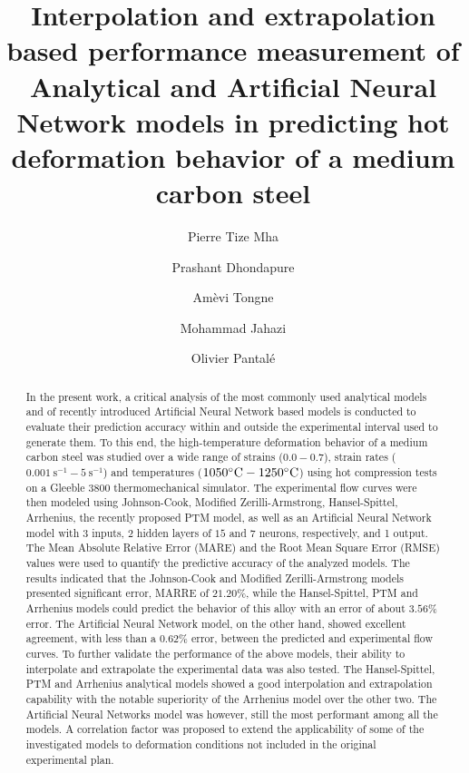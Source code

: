 \documentclass[twoside,english,1p,final,sort&compress]{elsarticle}
\theoremstyle{plain}
\DeclareRobustCommand{\ps}{\text{s}^{-1}}
\begin{document}
\begin{frontmatter}

\title{Interpolation and extrapolation based performance measurement of Analytical and Artificial Neural Network models in predicting hot deformation behavior of a medium carbon steel}

\author[LGP]{Pierre Tize Mha}
\author[ETS]{Prashant Dhondapure}
\author[LGP]{Amèvi Tongne}
\author[ETS]{Mohammad Jahazi}
\author[LGP]{Olivier Pantalé}


\address[LGP]{Laboratoire Génie de Production, INP/ENIT, Université de Toulouse, 47 Av d'Azereix, Tarbes, 65016, France}
\address[ETS]{École de Technologie Supérieure, 1100 Rue Notre Dame O, Montréal, QC H3C 1K3, Canada}

\begin{abstract}
In the present work, a critical analysis of the most commonly used analytical models and of recently introduced Artificial Neural Network based models is conducted to evaluate their prediction accuracy within and outside the experimental interval used to generate them. To this end, the high-temperature deformation behavior of a medium carbon steel was studied over a wide range of strains ($0.0-0.7$), strain rates ($0.001~\ps-5~\ps$) and temperatures ($1050\celsius-1250\celsius$) using hot compression tests on a Gleeble $3800$ thermomechanical simulator. The experimental flow curves were then modeled using Johnson-Cook, Modified Zerilli-Armstrong, Hansel-Spittel, Arrhenius, the recently proposed PTM model, as well as an Artificial Neural Network model with $3$ inputs, $2$ hidden layers of $15$ and $7$ neurons, respectively, and 1 output. The Mean Absolute Relative Error (MARE) and the Root Mean Square Error (RMSE) values were used to quantify the predictive accuracy of the analyzed models. The results indicated that the Johnson-Cook and Modified Zerilli-Armstrong models presented significant error, MARRE of  $21.20\%$, while the Hansel-Spittel, PTM and Arrhenius models could predict the behavior of this alloy with an error of about $3.56\%$ error. The Artificial Neural Network model, on the other hand, showed excellent agreement, with less than a $0.62\%$ error, between the predicted and experimental flow curves. To further validate the performance of the above models, their ability to interpolate and extrapolate the experimental data was also tested. The Hansel-Spittel, PTM and Arrhenius analytical models showed a good interpolation and extrapolation capability with the notable superiority of the Arrhenius model over the other two. The Artificial Neural Networks model was however, still the most performant among all the models. A correlation factor was proposed to extend the applicability of some of the investigated models to deformation conditions not included in the original experimental plan.
\end{abstract}


\end{frontmatter}
\end{document}
